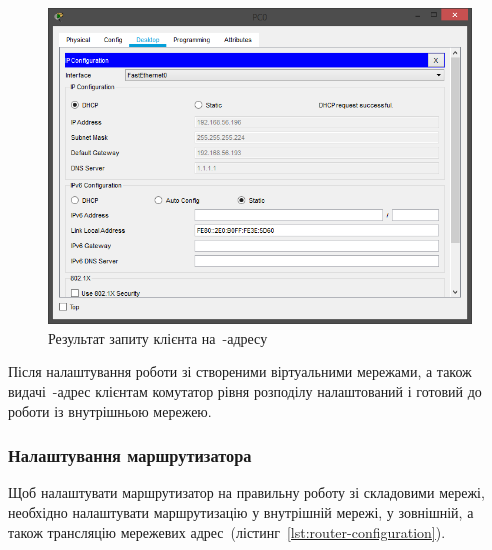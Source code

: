 \documentclass[
  ukrainian,
  simple,
  floatsection,
]{eskdnaukvd}
\newlength{\gridunitwidth}
\begin{document}
      \begin{figure}[!htbp]
        \centering
        \includegraphics[width = 8 \gridunitwidth]{./assets/11-switch-l3-dhcp.png}
        \caption{Результат запиту клієнта на~\textenglish{-адресу}}
        \label{fig:switch-l3-dhcp}
      \end{figure}

      Після налаштування роботи зі створеними віртуальними мережами, а також видачі~\textenglish{}-адрес клієнтам комутатор рівня розподілу налаштований і готовий до роботи із внутрішньою мережею.

    \subsubsection{Налаштування маршрутизатора}
      Щоб налаштувати маршрутизатор на правильну роботу зі складовими мережі, необхідно налаштувати маршрутизацію у внутрішній мережі, у зовнішній, а також трансляцію мережевих адрес~(лістинг~\ref{lst:router-configuration}).
\end{document}

